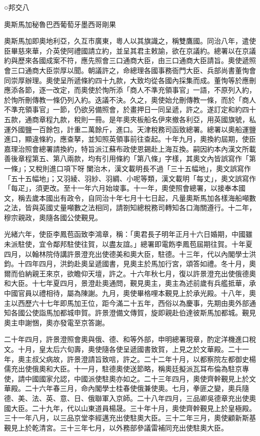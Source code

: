 
\begin{pinyinscope}
○邦交八

奧斯馬加秘魯巴西葡萄牙墨西哥剛果

奧斯馬加即奧地利亞，久互市廣東，粵人以其旗識之，稱雙鷹國。同治八年，遣使臣畢慈來華，介英使阿禮國請立約，並呈其君主敕諭，欲在京議約。總署以在京議約與歷來各國成案不符，應先照會三口通商大臣，由三口通商大臣請旨。奧使遞照會三口通商大臣崇厚以聞。朝議許之，命總理各國事務衙門大臣、兵部尚書董恂會同崇厚辦理。奧使呈所遞條約四十九款，大致均從各國內採集而成。董恂等於應刪應添各節，逐一改定，而奧使於恂所添「商人不準充領事官」一語，不原列入約，於恂所刪傳教一條仍列入約。迭議不決。久之，奧使始允刪傳教一條，而於「商人不準充領事官」一節，仍欲另備照會，於畫押日一同呈遞，許之。遂訂定和約四十五款，通商章程九款，稅則一冊。是年奧夾板船名伊來撤各利亞，用英國旗號，私運外國鹽一百餘包，計重二萬餘斤，進口。天津稅務司函致總署。總署以奧船運鹽進口，顯違條約，應查拏，並知照英領事前往查起。十年九月，奧換約屆期，使臣嘉理治照會總署請換約，特旨派江蘇布政使恩錫赴上海互換。嗣因約本內漢文所載善後章程第五、第八兩款，均有引用條約「第八條」字樣，其奧文內皆誤寫作「第一條」；又稅則進口項下呀闌治木，漢文載明長不過「三十五幅地」，奧文誤寫作「五十五幅地」；又羽綾、羽紗、羽綢、小呢等類，漢文載明「每丈」，奧文誤寫作「每疋」，須更改。至十一年六月始竣事。十一年，奧使照會總署，以接奉本國文，稱去歲本國出有政令，自同治十年七月十七日起，凡量奧斯馬加各樣海船噸數之法，皆與英國丈量噸數之法相同，請劄知總稅務司轉知各口海關遵行。十二年，穆宗親政，奧隨各國公使覲見。

光緒六年，使臣李鳳苞函致李鴻章，稱：「奧君長子明年正月十六日婚期，中國雖未派駐使，宜令鄰邦駐使往賀，以盡友誼。」總署即電飭李鳳苞屆期往賀。十年夏四月，以翰林院侍講許景澄充出使德美和奧大臣，駐德。十三年，代以內閣學士洪鈞。十四年四月，洪鈞赴奧呈遞國書，見奧主於馬加行宮，頌答如禮。冬十月，奧爾而伯納親王來京，欲瞻仰天壇，許之。十六年秋七月，復以許景澄充出使俄德奧和大臣。十七年夏四月，景澄赴奧通問，覲見奧主，奧主為述前歲有兵艦抵華，承中國官員以禮相待，屬為陳謝。九月，奧使畢格哩本覲見上於承光殿。十八年，奧主以西歷六十七年即馬加王位，距今滿二十五年，西俗以為慶事，先期由奧外部通知各國公使詣馬加都城申賀。許景澄備文傳賀，旋即親赴伯達彼斯馬加都城。覲見奧主申謝悃，奧亦發電至京答謝。

二十年四月，許景澄照會奧與俄、德、和等外部，申明總署現章，酌定洋機進口稅文。十月，皇太后六旬壽，奧使隨各使呈遞國書致賀，上見之於文華殿。二十一年，奧主叔父病故，許景澄請旨致唁，許之。二十二年十月，以都察院左都御史楊儒充出使俄奧和大臣。十一月，駐德奧使送節略，稱奧廷擬派瓦耳布倫為駐京專使，請中國國家允認，中國派使駐奧亦如之。二十三年四月，奧使齊幹覲見上於文華殿。二十六年春三月，命內閣學士桂春使俄兼使奧。七月，拳匪之變，奧兵隨德、美、法、英、意、日、俄聯軍入京師。二十八年四月，三品卿吳德章充出使奧國大臣。二十九年，代以山東道員楊晟。三十年十月，奧使齊幹覲見上於皇極殿。三十一年八月，以三品京堂李經邁充出使駐奧大臣。三十二年三月，奧使顧新斯基覲見上於乾清宮。三十三年七月，以外務部參議雷補同充出使駐奧大臣。


\end{pinyinscope}
